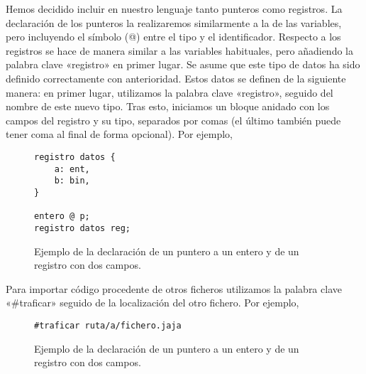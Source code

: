 Hemos decidido incluir en nuestro lenguaje tanto punteros como registros. La
declaración de los punteros la realizaremos similarmente a la de las variables,
pero incluyendo el símbolo (@) entre el tipo y el identificador. Respecto a los
registros se hace de manera similar a las variables habituales, pero añadiendo
la palabra clave «registro» en primer lugar. Se asume que este tipo de datos ha
sido definido correctamente con anterioridad. Estos datos se definen de la
siguiente manera: en primer lugar, utilizamos la palabra clave «registro»,
seguido del nombre de este nuevo tipo. Tras esto, iniciamos un bloque anidado
con los campos del registro y su tipo, separados por comas (el último también
puede tener coma al final de forma opcional). Por ejemplo,
\begin{figure}[H]
    \centering
    \begin{lstlisting}
registro datos {
    a: ent,
    b: bin,
}

entero @ p;
registro datos reg;
    \end{lstlisting}
    \caption{Ejemplo de la declaración de un puntero a un entero y de un
    registro con dos campos.}
\end{figure}

Para importar código procedente de otros ficheros utilizamos la palabra clave
«\#traficar» seguido de la localización del otro fichero. Por ejemplo,
\begin{figure}[H]
    \centering
    \begin{lstlisting}
#traficar ruta/a/fichero.jaja
    \end{lstlisting}
    \caption{Ejemplo de la declaración de un puntero a un entero y de un
    registro con dos campos.}
\end{figure}

